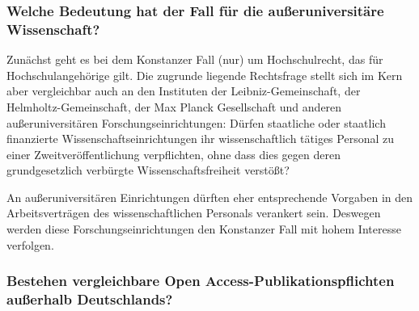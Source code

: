 \documentclass[a4paper,
fontsize=11pt,
oneside,
numbers=noperiodatend,
parskip=half-,
bibliography=totoc,
final
]{scrartcl}
\begin{document}
\hypertarget{welche-bedeutung-hat-der-fall-fuxfcr-die-auuxdferuniversituxe4re-wissenschaft}{%
\subsubsection{Welche Bedeutung hat der Fall für die außeruniversitäre
Wissenschaft?}\label{welche-bedeutung-hat-der-fall-fuxfcr-die-auuxdferuniversituxe4re-wissenschaft}}

Zunächst geht es bei dem Konstanzer Fall (nur) um Hochschulrecht, das
für Hochschulangehörige gilt. Die zugrunde liegende Rechtsfrage stellt
sich im Kern aber vergleichbar auch an den Instituten der
Leibniz-Gemeinschaft, der Helmholtz-Gemeinschaft, der Max Planck
Gesellschaft und anderen außeruniversitären Forschungseinrichtungen:
Dürfen staatliche oder staatlich finanzierte Wissenschaftseinrichtungen
ihr wissenschaftlich tätiges Personal zu einer Zweitveröffentlichung
verpflichten, ohne dass dies gegen deren grundgesetzlich verbürgte
Wissenschaftsfreiheit verstößt?

An außeruniversitären Einrichtungen dürften eher entsprechende Vorgaben
in den Arbeitsverträgen des wissenschaftlichen Personals verankert sein.
Deswegen werden diese Forschungseinrichtungen den Konstanzer Fall mit
hohem Interesse verfolgen.

\hypertarget{bestehen-vergleichbare-open-access-publikationspflichten-auuxdferhalb-deutschlands}{%
\subsubsection{Bestehen vergleichbare Open Access-Publikationspflichten
außerhalb
Deutschlands?}\label{bestehen-vergleichbare-open-access-publikationspflichten-auuxdferhalb-deutschlands}}
\end{document}
